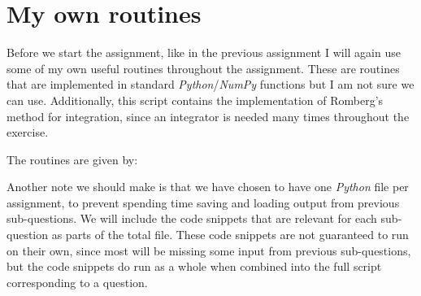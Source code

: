 \section*{My own routines}
Before we start the assignment, like in the previous assignment I will again use some of my own useful routines throughout the assignment. These are routines that are implemented in standard \textit{Python}/\textit{NumPy} functions but I am not sure we can use. Additionally, this script contains the implementation of Romberg's method for integration, since an integrator is needed many times throughout the exercise. 

The routines are given by:


Another note we should make is that we have chosen to have one \textit{Python} file per assignment, to prevent spending time saving and loading output from previous sub-questions. We will include the code snippets that are relevant for each sub-question as parts of the total file. These code snippets are not guaranteed to run on their own, since most will be missing some input from previous sub-questions, but the code snippets do run as a whole when combined into the full script corresponding to a question.